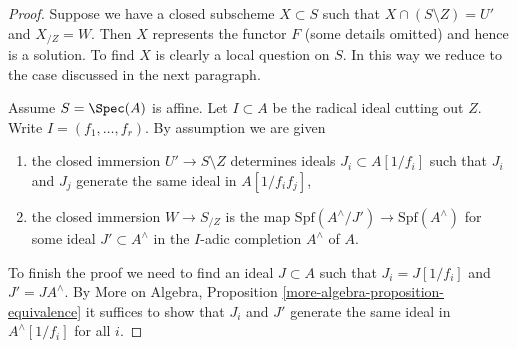 \begin{proof}
Suppose we have a closed subscheme $X \subset S$ such that
$X \cap (S \setminus Z) = U'$ and $X_{/Z} = W$. Then
$X$ represents the functor $F$ (some details omitted) and hence
is a solution. To find $X$ is clearly a local question on $S$.
In this way we reduce to the case discussed in the next paragraph.

\medskip\noindent
Assume $S = \Spec(A)$ is affine. Let $I \subset A$ be the
radical ideal cutting out $Z$.
Write $I = (f_1, \ldots, f_r)$. By assumption we are given
\begin{enumerate}
\item the closed immersion $U' \to S \setminus Z$ determines
ideals $J_i \subset A[1/f_i]$ such that $J_i$ and $J_j$
generate the same ideal in $A[1/f_if_j]$,
\item the closed immersion $W \to S_{/Z}$ is the map
$\text{Spf}(A^\wedge/J') \to \text{Spf}(A^\wedge)$ for some
ideal $J' \subset A^\wedge$ in the $I$-adic completion $A^\wedge$ of $A$.
\end{enumerate}
To finish the proof we need to find an ideal $J \subset A$
such that $J_i = J[1/f_i]$ and $J' = JA^\wedge$. By
More on Algebra, Proposition \ref{more-algebra-proposition-equivalence}
it suffices to show that $J_i$ and $J'$ generate the same ideal
in $A^\wedge[1/f_i]$ for all $i$.


\end{proof}
